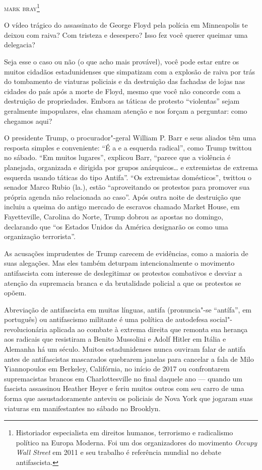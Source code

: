 \hfill{}\textsc{mark bray\footnote[\dag]{Historiador especialista em direitos humanos, terrorismo e radicalismo político na Europa Moderna. Foi um dos organizadores do movimento \emph{Occupy Wall Street} em 2011 e seu trabalho é referência mundial no debate antifascista.}}

\bigskip

O vídeo trágico do assassinato de George Floyd pela polícia em Minneapolis te deixou com raiva? Com tristeza e desespero? Isso fez você querer queimar uma delegacia?
 
Seja esse o caso ou não (o que acho mais provável), você pode estar entre os muitos cidadãos estadunidenses que simpatizam com a explosão de raiva por trás do tombamento de viaturas policiais e da destruição das fachadas de lojas nas cidades do país após a morte de Floyd, mesmo que você não concorde com a destruição de propriedades. Embora as táticas de protesto ``violentas'' sejam geralmente impopulares, elas chamam atenção e nos forçam a perguntar: como chegamos aqui?

O presidente Trump, o procurador"-geral William P. Barr e seus aliados têm uma resposta simples e conveniente: ``É a  e a esquerda radical'', como Trump twittou no sábado. ``Em muitos lugares'', explicou Barr, ``parece que a violência é planejada, organizada e dirigida por grupos anárquicos\ldots{} e extremistas de extrema esquerda usando táticas do tipo Antifa''. ``Os extremistas domésticos'', twittou o senador Marco Rubio (la.), estão ``aproveitando os protestos para promover sua própria agenda não relacionada ao caso''. Após outra noite de destruição que incluiu a queima do antigo mercado de escravos chamado Market House, em Fayetteville, Carolina do Norte, Trump dobrou as apostas no domingo, declarando que ``os Estados Unidos da América designarão os  como uma organização terrorista''.
 
As acusações imprudentes de Trump carecem de evidências, como a maioria de suas alegações. Mas eles também deturpam intencionalmente o movimento antifascista com interesse de deslegitimar os protestos combativos e desviar a atenção da supremacia branca e da brutalidade policial a que os protestos se opõem.
 
Abreviação de antifascista em muitas línguas, antifa (pronuncia"-se ``antífa'', em português) ou antifascismo militante é uma política de autodefesa social"-revolucionária aplicada ao combate à extrema direita que remonta sua herança aos radicais que resistiram a Benito Mussolini e Adolf Hitler em Itália e Alemanha há um século. Muitos estadunidenses nunca ouviram falar de antifa antes de antifascistas mascarados quebrarem janelas para cancelar a fala de Milo Yiannopoulos em Berkeley, Califórnia, no início de 2017 ou confrontarem supremacistas brancos em Charlottesville no final daquele ano — quando um fascista assassinou Heather Heyer e feriu muitos outros com seu carro de uma forma que assustadoramente anteviu os policiais de Nova York que jogaram suas viaturas em manifestantes no sábado no Brooklyn.

